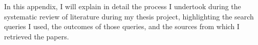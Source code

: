 In this appendix, I will explain in detail the process I undertook during the systematic review of literature during my thesis project, highlighting the search queries I used, the outcomes of those queries, and the sources from which I retrieved the papers.